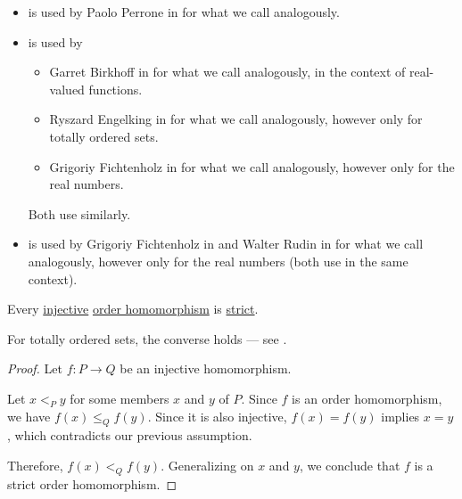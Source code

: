\begin{remark}
\begin{itemize}
    \item {} is used by Paolo Perrone in \cite[exmpl. 1.5.9]{Perrone2019} for what we call analogously.

    \item {} is used by
    \begin{itemize}
      \item Garret Birkhoff in \cite[208]{Birkhoff1948} for what we call analogously, in the context of real-valued functions.
      \item Ryszard Engelking in \cite[8]{Engelking1989} for what we call analogously, however only for totally ordered sets.
      \item Grigoriy Fichtenholz in \cite[№47]{ФихтенгольцОсновыТом1} for what we call analogously, however only for the real numbers.
    \end{itemize}

    Both use  similarly.

    \item {} is used by Grigoriy Fichtenholz in \cite[№47]{ФихтенгольцОсновыТом1} and Walter Rudin in \cite[def. 4.28]{Rudin1976Principles} for what we call analogously, however only for the real numbers (both use  in the same context).
  \end{itemize}
\end{remark}

\begin{proposition}\label{thm:order_embedding_is_strict}
  Every \hyperref[def:function_invertibility/injective]{injective} \hyperref[def:order_homomorphism/increasing]{order homomorphism} is \hyperref[def:order_homomorphism/increasing]{strict}.
\end{proposition}
\begin{comments}
  \item For totally ordered sets, the converse holds --- see .
\end{comments}
\begin{proof}
  Let \( f: P \to Q \) be an injective homomorphism.

  Let \( x <_P y \) for some members \( x \) and \( y \) of \( P \). Since \( f \) is an order homomorphism, we have \( f(x) \leq_Q f(y) \). Since it is also injective, \( f(x) = f(y) \) implies \( x = y \), which contradicts our previous assumption.

  Therefore, \( f(x) <_Q f(y) \). Generalizing on \( x \) and \( y \), we conclude that \( f \) is a strict order homomorphism.
\end{proof}
